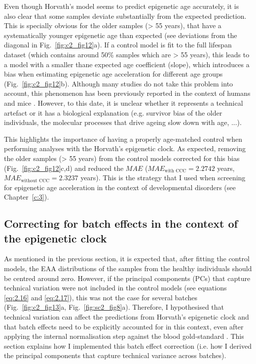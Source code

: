\bigskip

Even though Horvath's model seems to predict epigenetic age accurately, it is also clear that some samples deviate substantially from the expected prediction. This is specially obvious for the older samples (> 55 years), that have a systematically younger epigenetic age than expected (see deviations from the diagonal in  Fig.~\ref{fig:c2_fig12}a). If a control model is fit to the full lifespan dataset (which contains around 50\% samples which are > 55 years), this leads to a model with a smaller thane expected age coefficient (slope), which introduces a bias when estimating epigenetic age acceleration for different age groups (Fig.~\ref{fig:c2_fig12}b). Although many studies do not take this problem into account, this phenomenon has been previously reported in the context of humans \cite{ElKhoury2018,Marioni2018} and mice \cite{Stubbs2017}. However, to this date, it is unclear whether it represents a technical artefact or it has a biological explanation (e.g. survivor bias of the older individuals, the molecular processes that drive ageing slow down with age, ...). 

\bigskip

This highlights the importance of having a properly age-matched control when performing analyses with the Horvath's epigenetic clock. As expected, removing the older samples (> 55 years) from the control models corrected for this bias (Fig.~\ref{fig:c2_fig12}c,d) and reduced the $MAE$ ($MAE_{\text{with CCC}} = 2.2742$ years, $MAE_{\text{without CCC}} = 2.3237$ years). This is the strategy that I used when screening for epigenetic age acceleration in the context of developmental disorders (see Chapter~\ref{c:3}).

\smallskip

\subsection{Correcting for batch effects in the context of the epigenetic clock} \label{s:2.2.3}

\smallskip

As mentioned in the previous section, it is expected that, after fitting the control models, the EAA distributions of the samples from the healthy individuals should be centred around zero. However, if the principal components (\acrshort{PC}s) that capture technical variation were not included in the control models (see equations \ref{eq:2.16} and \ref{eq:2.17}), this was not the case for several batches (Fig.~\ref{fig:c2_fig13}a, Fig.~\ref{fig:sc2_fig8}a). Therefore, I hypothesised that technical variation can affect the predictions from Horvath's epigenetic clock and that batch effects need to be explicitly accounted for in this context, even after applying the internal normalisation step against the blood gold-standard \cite{Horvath2013}. This section explains how I implemented this batch effect correction (i.e. how I derived the principal components that capture technical variance across batches).

